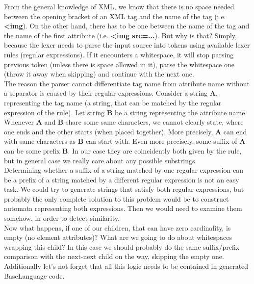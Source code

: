 From the general knowledge of XML, we know that there is no space needed between the opening bracket of an XML tag and the name of the tag (i.e. \textbf{{\textless}img}).
On the other hand, there has to be one between the name of the tag and the name of the first attribute (i.e. \textbf{{\textless}img src=...}).
But why is that?
Simply, because the lexer needs to parse the input source into tokens using available lexer rules (regular expressions).
If it encounters a whitespace, it will stop parsing previous token (unless there is space allowed in it), parse the whitespace one (throw it away when skipping) and continue with the next one.
\\

The reason the parser cannot differentiate tag name from attribute name without a separator is caused by their regular expressions.
Consider a string \textbf{A}, representing the tag name (a string, that can be matched by the regular expression of the  rule).
Let string \textbf{B} be a string representing the attribute name.
Whenever \textbf{A} and \textbf{B} share some same characters, we cannot clearly state, where one ends and the other starts (when placed together).
More precisely, \textbf{A} can end with same characters as \textbf{B} can start with.
Even more precisely, some suffix of \textbf{A} can be some prefix \textbf{B}.
In our case they are coincidently both given by the  rule, but in general case we really care about any possible substrings.
\\

Determining whether a suffix of a string matched by one regular expression can be a prefix of a string matched by a different regular expression is not an easy task.
We could try to generate strings that satisfy both regular expressions, but probably the only complete solution to this problem would be to construct automata representing both expressions.
Then we would need to examine them somehow, in order to detect similarity.
\\

Now what happens, if one of our children, that can have zero cardinality, is empty (no element attributes)?
What are we going to do about whitespaces wrapping this child?
In this case we should probably do the same suffix/prefix comparison with the next-next child on the way, skipping the empty one.
Additionally let's not forget that all this logic needs to be contained in generated BaseLanguage code.
\\

